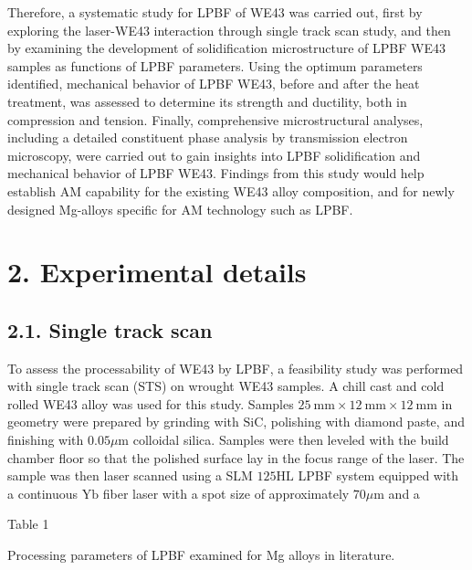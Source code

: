 \documentclass[10pt]{article}
\begin{document}
Therefore, a systematic study for LPBF of WE43 was carried out, first by exploring the laser-WE43 interaction through single track scan study, and then by examining the development of solidification microstructure of LPBF WE43 samples as functions of LPBF parameters. Using the optimum parameters identified, mechanical behavior of LPBF WE43, before and after the heat treatment, was assessed to determine its strength and ductility, both in compression and tension. Finally, comprehensive microstructural analyses, including a detailed constituent phase analysis by transmission electron microscopy, were carried out to gain insights into LPBF solidification and mechanical behavior of LPBF WE43. Findings from this study would help establish AM capability for the existing WE43 alloy composition, and for newly designed Mg-alloys specific for AM technology such as LPBF.

\section*{2. Experimental details}
\subsection*{2.1. Single track scan}
To assess the processability of WE43 by LPBF, a feasibility study was performed with single track scan (STS) on wrought WE43 samples. A chill cast and cold rolled WE43 alloy was used for this study. Samples $25 \mathrm{~mm} \times 12 \mathrm{~mm} \times 12 \mathrm{~mm}$ in geometry were prepared by grinding with $\mathrm{SiC}$, polishing with diamond paste, and finishing with $0.05 \mu \mathrm{m}$ colloidal silica. Samples were then leveled with the build chamber floor so that the polished surface lay in the focus range of the laser. The sample was then laser scanned using a SLM $125 \mathrm{HL}$ LPBF system equipped with a continuous $\mathrm{Yb}$ fiber laser with a spot size of approximately $70 \mu \mathrm{m}$ and a

Table 1

Processing parameters of LPBF examined for Mg alloys in literature.
\end{document}
